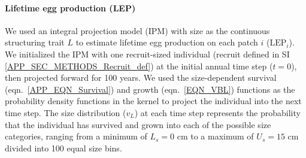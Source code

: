 \documentclass[12pt, oneside]{article}   	%
\begin{document}




\paragraph*{Lifetime egg production (LEP)}

We used an integral projection model (IPM) \citep{ellner2016data} with size as the continuous structuring trait $L$ to estimate lifetime egg production on each patch $i$ ($\text{LEP}_i$). We initialized the IPM with one recruit-sized individual (recruit defined in SI \ref{APP_SEC_METHODS_Recruit_def}) at the initial annual time step ($t=0$), then projected forward for 100 years. We used the size-dependent survival (eqn.\ \ref{APP_EQN_Survival}) and growth (eqn.\ \ref{EQN_VBL}) functions as the probability density functions in the kernel to project the individual into the next time step. The size distribution ($v_L$) at each time step represents the probability that the individual has survived and grown into each of the possible size categories, ranging from a minimum of $L_s=0$ cm to a maximum of $U_s=15$ cm divided into 100 equal size bins. %
\end{document}
